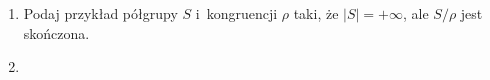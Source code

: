 \documentclass[a4paper,11pt]{article}
\begin{document}
\begin{enumerate}

\item Podaj przykład półgrupy $S$ i~kongruencji $\rho$ taki, że $| S | = +\infty$,
  ale $S / \rho$ jest skończona.

\item



























\end{enumerate}
\end{document}

